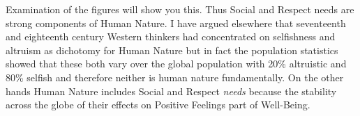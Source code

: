 \documentclass{amsart}
\begin{document}
Examination of the figures will show you this.  Thus Social and Respect needs are strong components of Human Nature.  I have argued elsewhere that seventeenth and eighteenth century Western thinkers had concentrated on selfishness and altruism as dichotomy for Human Nature but in fact the population statistics showed that these both vary over the global population with 20\% altruistic and 80\% selfish and therefore neither is human nature fundamentally.  On the other hands Human Nature includes Social and Respect {\em needs} because the stability across the globe of their effects on Positive Feelings part of Well-Being.
\end{document}
